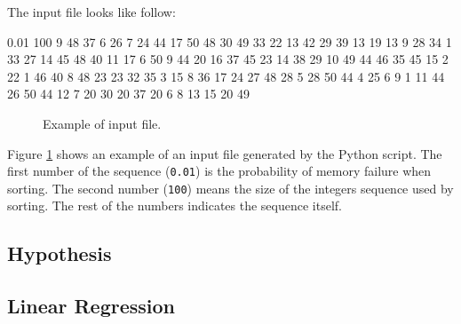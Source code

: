 The input file looks like follow:

\begin{verbbox}[\mbox{}]
0.01 100 9 48 37 6 26 7 24 44 17 50 48 30 49 33 22 13 42 29 39 13 19 13 9 28 
34 1 33 27 14 45 48 40 11 17 6 50 9 44 20 16 37 45 23 14 38 29 10 49 44 46 35
45 15 2 22 1 46 40 8 48 23 23 32 35 3 15 8 36 17 24 27 48 28 5 28 50 44 4 25 
6 9 1 11 44 26 50 44 12 7 20 30 20 37 20 6 8 13 15 20 49
\end{verbbox}

\begin{figure}[hbtp]
    \centering
    \fbox{
    \theverbbox
    }
    \caption{Example of input file.}
    \label{input-file-example}
\end{figure}

Figure \ref{input-file-example} shows an example of an input file generated by the Python script. The first number of the sequence (\texttt{0.01}) is the probability of memory failure when sorting. The second number (\texttt{100}) means the size of the integers sequence used by sorting. The rest of the numbers indicates the sequence itself.

\subsection{Hypothesis}

\subsection{Linear Regression}